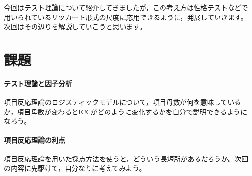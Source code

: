 \documentclass{ltjsbook}
\begin{document}
今回はテスト理論について紹介してきましたが，この考え方は性格テストなどで用いられているリッカート形式の尺度に応用できるように，発展していきます。次回はその辺りを解説していこうと思います。

\section{課題}
\paragraph{テスト理論と因子分析} 項目反応理論のロジスティックモデルについて，項目母数が何を意味しているか，項目母数が変わるとICCがどのように変化するかを自分で説明できるようになろう。
\paragraph{項目反応理論の利点} 項目反応理論を用いた採点方法を使うと，どういう長短所があるだろうか。次回の内容に先駆けて，自分なりに考えてみよう。
\end{document}
